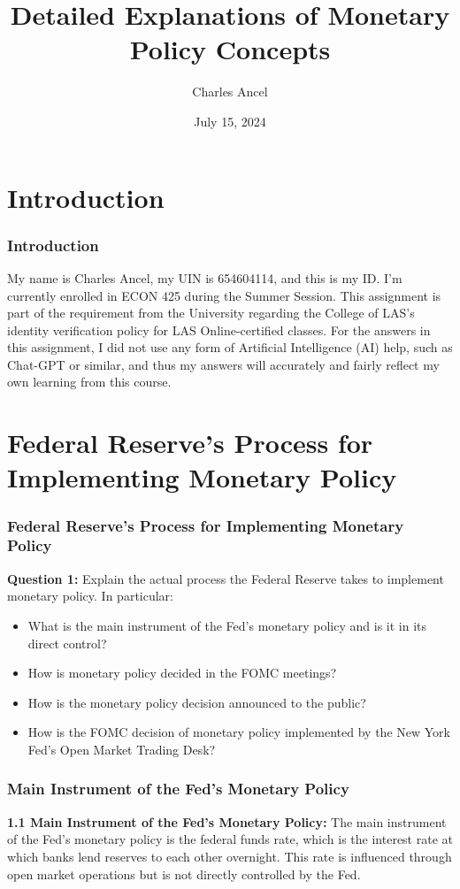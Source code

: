 \documentclass{beamer}
\title{Detailed Explanations of Monetary Policy Concepts}
\author{Charles Ancel}
\date{July 15, 2024}
\begin{document}
\begin{frame}
    \titlepage{}
\end{frame}

\section{Introduction}
\begin{frame}
    \frametitle{Introduction}
    My name is Charles Ancel, my UIN is 654604114, and this is my ID\@. I'm currently enrolled in ECON 425 during the Summer Session. This assignment is part of the requirement from the University regarding the College of LAS's identity verification policy for LAS Online-certified classes. For the answers in this assignment, I did not use any form of Artificial Intelligence (AI) help, such as Chat-GPT or similar, and thus my answers will accurately and fairly reflect my own learning from this course.
\end{frame}

\section{Federal Reserve's Process for Implementing Monetary Policy}
\begin{frame}
    \frametitle{Federal Reserve's Process for Implementing Monetary Policy}
    \textbf{Question 1:} Explain the actual process the Federal Reserve takes to implement monetary policy. In particular:
    \begin{itemize}
        \item What is the main instrument of the Fed's monetary policy and is it in its direct control?
        \item How is monetary policy decided in the FOMC meetings?
        \item How is the monetary policy decision announced to the public?
        \item How is the FOMC decision of monetary policy implemented by the New York Fed's Open Market Trading Desk?
    \end{itemize}
\end{frame}

\begin{frame}
    \frametitle{Main Instrument of the Fed's Monetary Policy}
    \textbf{1.1 Main Instrument of the Fed's Monetary Policy:} The main instrument of the Fed's monetary policy is the federal funds rate, which is the interest rate at which banks lend reserves to each other overnight. This rate is influenced through open market operations but is not directly controlled by the Fed.
\end{frame}
\end{document}
